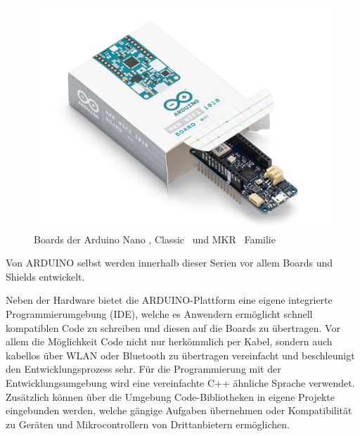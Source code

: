 \documentclass[
    load-dhbw-templates,
    load-preamble = true,
    auto-intro-pages = all,
    add-tocs-to-toc,
    debug = true,
    language = english,
    mainlanguage = ngerman,
    add-bibliography,
    bib-file = dhbw-source.bib,
    biblatex/style = numeric,
    print- = false
]{iodhbwm}
\begin{document}
\begin{figure}[!hbpt]
\begin{minipage}[t]{0.45\linewidth}
        \end{minipage}
        \begin{minipage}[t]{0.45\linewidth}
            \includegraphics[scale=0.5]{../Fotos/Arduino_Family/MKR_Wifi_1010.png}
        \end{minipage}
        \caption[Arduino Family]{Boards der Arduino Nano \footnotemark, Classic \footnotemark ~und MKR \footnotemark ~Familie}
        \label{fig:Arduino_Family} 
        \end{figure}

        

        Von ARDUINO selbst werden innerhalb dieser Serien vor allem Boards und Shields entwickelt.%

        Neben der Hardware bietet die ARDUINO-Plattform eine eigene integrierte Programmierumgebung (IDE), welche es Anwendern ermöglicht schnell kompatiblen Code zu schreiben und diesen auf die Boards zu übertragen. Vor allem die Möglichkeit Code nicht nur herkömmlich per Kabel, sondern auch kabellos über WLAN oder Bluetooth zu übertragen vereinfacht und beschleunigt den Entwicklungsprozess sehr. Für die Programmierung mit der Entwicklungsumgebung wird eine vereinfachte C++ ähnliche Sprache verwendet. %
        Zusätzlich können über die Umgebung Code-Bibliotheken in eigene Projekte eingebunden werden, welche gängige Aufgaben übernehmen oder Kompatibilität zu Geräten und Mikrocontrollern von Drittanbietern ermöglichen.%
        
\end{document}
